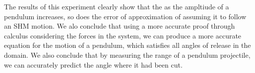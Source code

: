 The results of this experiment clearly show that the as the ampltiude of a pendulum increases, so does the error of approximation of assuming it to follow an SHM motion. We alo conclude that using a more accurate proof through calculus considering the forces in the system, we can produce a more accurate equation for the motion of a pendulum, which satisfies all angles of release in the domain. We also conclude that by measuring the range of a pendulum projectile, we can accurately predict the angle where it had been cut.